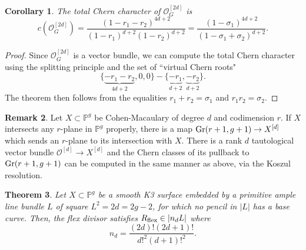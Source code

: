 \documentclass{amsart}
\newtheorem{theorem}{Theorem}[section]
\newtheorem{corollary}[theorem]{Corollary}
\theoremstyle{definition}
\newtheorem{remark}[theorem]{Remark}
\begin{document}
\begin{corollary}\label{tot-chern} The total Chern character of $\mathcal{O}_G^{[2d]}$ is $$c(\mathcal{O}_G^{[2d]})=\frac{(1-r_1-r_2)^{4d+2}}{(1-r_1)^{d+2}(1-r_2)^{d+2}} = \frac{(1-\sigma_1)^{4d+2}}{(1-\sigma_1+\sigma_2)^{d+2}} .$$ \end{corollary}

\begin{proof} Since $\mathcal{O}_G^{[2d]}$ is a vector bundle, we can compute
the total Chern character using the splitting principle and the set of ``virtual Chern roots"
$$\{\underbrace{-r_1-r_2}_{4d+2}, 0,0\}-\{\underbrace{-r_1}_{d+2},\underbrace{-r_2}_{d+2}\}.$$
The theorem then follows from the equalities $r_1+r_2=\sigma_1$ and $r_1r_2=\sigma_2$.
\end{proof}

\begin{remark} Let
$X\subset \mathbb{P}^g$ be Cohen-Macaulary
of degree $d$ and codimension $r$.
If $X$ intersects any
$r$-plane in $\mathbb{P}^g$
properly, there is a map ${\rm Gr}(r+1,g+1)\to X^{[d]}$
which sends an $r$-plane to its intersection with $X$. 
There is a rank $d$ tautological vector
bundle $\mathcal{O}^{[d]}\to X^{[d]}$ and 
the Chern classes of its pullback to ${\rm Gr}(r+1,g+1)$
can be computed in the same manner 
as above, via the Koszul resolution.
  \end{remark}

\begin{theorem}\label{final} Let $X\subset \mathbb{P}^g$ be a smooth K3 surface
embedded by a primitive ample line bundle $L$ of square $L^2=2d=2g-2$,
for which no pencil in $|L|$ has a base curve.
Then, the flex divisor satisfies $R_{\rm flex}\in |n_dL|$
where $$n_d = \frac{(2d)!(2d+1)!}{d!^2(d+1)!^2}.$$ \end{theorem}
\end{document}
